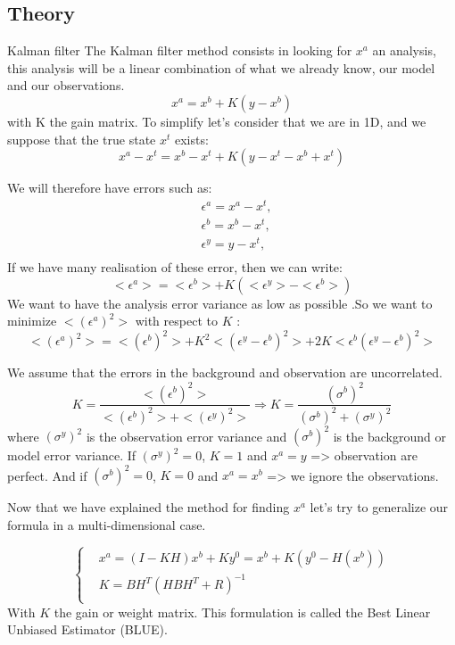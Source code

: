 \subsection{Theory}
\begin{frame}[allowframebreaks]{Kalman filter}
    The Kalman filter method consists in looking for $x^a$ an analysis, this analysis will be a linear combination of what we already know, our model and our observations.
    $$x^a=x^b+K(y-x^b)$$
    with K the gain matrix.
    To simplify let’s consider that we are in 1D, and we suppose that the true state $x^t$ exists:
    $$x^a-x^t=x^b-x^t+K(y-x^t-x^b+x^t)$$
	
	\newpage

    We will therefore have errors such as:
    $$\begin{aligned}
        &\epsilon^a=x^a-x^t, \\
        &\epsilon^b=x^b-x^t, \\
        &\epsilon^y=y-x^t, \\
    \end{aligned}$$
    If we have many realisation of these error, then we can write:
    $$<\epsilon^a>=<\epsilon^b>+K(<\epsilon^y>-<\epsilon^b>)$$
    We want to have the analysis error variance as low as possible .So we want to minimize $<(\epsilon^a)^2>$ with respect to $K$ :
    $$<(\epsilon^a)^2>=<(\epsilon^b)^2>+K^2<(\epsilon^y-\epsilon^b)^2>+2K<\epsilon^b(\epsilon^y-\epsilon^b)^2>$$
    
    \newpage
    
    We assume that the errors in the background and observation are uncorrelated.
    $$K=\frac{<(\epsilon^b)^2>}{<(\epsilon^b)^2>+<(\epsilon^y)^2>} \Rightarrow K=\frac{(\sigma^b)^2}{(\sigma^b)^2+(\sigma^y)^2} $$
    where $(\sigma^y)^2$ is the observation error variance and $(\sigma^b)^2$ is the background or model error variance.
    \newline If  $(\sigma^y)^2=0$, $K=1$ and $x^a=y$ => observation are perfect.
    \newline And if $(\sigma^b)^2=0$, $K=0$ and $x^a=x^b$ => we ignore the observations.

	\newpage

    Now that we have explained the method for finding $x^a$ let's try to generalize our formula in a multi-dimensional case.

    $$\left\{\begin{aligned}
  &x^a=(I-KH)x^b+Ky^0=x^b+K(y^0-H(x^b)) \\
        &K=BH^T(HBH^T+R)^{-1} \\
 \end{aligned}\right.$$
    With $K$ the gain or weight matrix.
    This formulation is called the Best Linear Unbiased Estimator (BLUE).

	\newpage

\end{frame}

